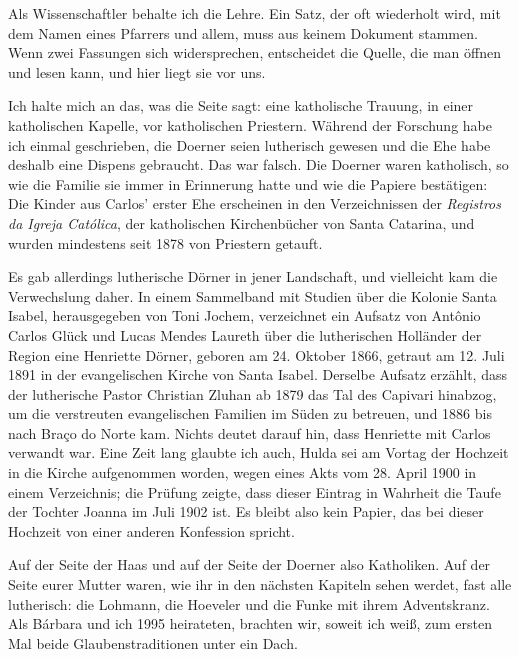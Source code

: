 \documentclass[
  ngerman,
  11pt,
  openany]{book}
\begin{document}
Als Wissenschaftler behalte ich die Lehre. Ein Satz, der oft wiederholt
wird, mit dem Namen eines Pfarrers und allem, muss aus keinem Dokument
stammen. Wenn zwei Fassungen sich widersprechen, entscheidet die Quelle,
die man öffnen und lesen kann, und hier liegt sie vor uns.

Ich halte mich an das, was die Seite sagt: eine katholische Trauung, in
einer katholischen Kapelle, vor katholischen Priestern. Während der
Forschung habe ich einmal geschrieben, die Doerner seien lutherisch
gewesen und die Ehe habe deshalb eine Dispens gebraucht. Das war falsch.
Die Doerner waren katholisch, so wie die Familie sie immer in Erinnerung
hatte und wie die Papiere bestätigen: Die Kinder aus Carlos' erster Ehe
erscheinen in den Verzeichnissen der \emph{Registros da Igreja
Católica}, der katholischen Kirchenbücher von Santa Catarina, und wurden
mindestens seit 1878 von Priestern getauft.

Es gab allerdings lutherische Dörner in jener Landschaft, und vielleicht
kam die Verwechslung daher. In einem Sammelband mit Studien über die
Kolonie Santa Isabel, herausgegeben von Toni Jochem, verzeichnet ein
Aufsatz von Antônio Carlos Glück und Lucas Mendes Laureth über die
lutherischen Holländer der Region eine Henriette Dörner, geboren am 24.
Oktober 1866, getraut am 12. Juli 1891 in der evangelischen Kirche von
Santa Isabel. Derselbe Aufsatz erzählt, dass der lutherische Pastor
Christian Zluhan ab 1879 das Tal des Capivari hinabzog, um die
verstreuten evangelischen Familien im Süden zu betreuen, und 1886 bis
nach Braço do Norte kam. Nichts deutet darauf hin, dass Henriette mit
Carlos verwandt war. Eine Zeit lang glaubte ich auch, Hulda sei am
Vortag der Hochzeit in die Kirche aufgenommen worden, wegen eines Akts
vom 28. April 1900 in einem Verzeichnis; die Prüfung zeigte, dass dieser
Eintrag in Wahrheit die Taufe der Tochter Joanna im Juli 1902 ist. Es
bleibt also kein Papier, das bei dieser Hochzeit von einer anderen
Konfession spricht.

Auf der Seite der Haas und auf der Seite der Doerner also Katholiken.
Auf der Seite eurer Mutter waren, wie ihr in den nächsten Kapiteln sehen
werdet, fast alle lutherisch: die Lohmann, die Hoeveler und die Funke
mit ihrem Adventskranz. Als Bárbara und ich 1995 heirateten, brachten
wir, soweit ich weiß, zum ersten Mal beide Glaubenstraditionen unter ein
Dach.
\end{document}
